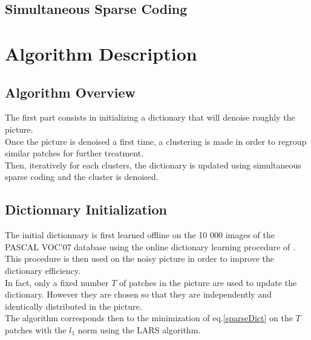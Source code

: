 \documentclass{ipol}
\begin{document}
\subsection {Simultaneous Sparse Coding}


\section{Algorithm Description}

\subsection{ Algorithm Overview }

The first part consists in initializing a dictionary that will denoise roughly the picture.\\
Once the picture is denoised a first time, a clustering is made in order to regroup similar patches for further treatment.\\
Then, iteratively for each clusters, the dictionary is updated using simultaneous sparse coding and the cluster is denoised.

\subsection{Dictionnary Initialization}

The initial dictionnary is first learned offline on the 10 000 images of the PASCAL VOC'07 database using the  online dictionary learning procedure of \cite{onlineLearning}. This procedure is then used on the noisy picture in order to improve the dictionary efficiency.\\
In fact, only a fixed number $T$ of patches in the picture are used to update the dictionary. However they are chosen so that they are independently and identically distributed in the picture.\\
The algorithm corresponds then to the minimization of eq.\ref{sparseDict} on the $T$ patches with the $l_1$ norm using the LARS \cite{LARS} algorithm.\\
\end{document}
